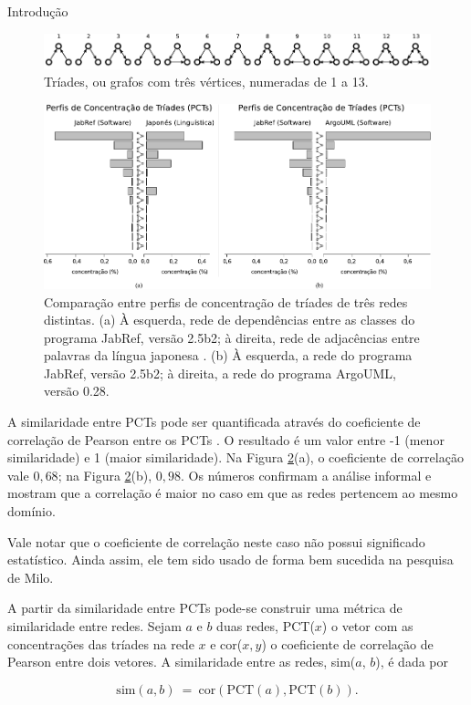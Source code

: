 \begin{section}{Introdução}
\begin{figure}[htbp]
	\centering
		\includegraphics[scale=1]{figuras/triads}
	\caption{Tríades, ou grafos com três vértices, numeradas de 1 a 13.}
	\label{fig:triades}
\end{figure}

\begin{figure}[htbp]
	\centering
		\includegraphics[width=1\textwidth]{figuras/tcp}
	\caption{Comparação entre perfis de concentração de tríades de três redes distintas. (a) À esquerda, rede de dependências entre as classes do programa JabRef, versão 2.5b2; à direita, rede de adjacências entre palavras da língua japonesa \cite{Milo2004}. (b) À esquerda, a rede do programa JabRef, versão 2.5b2; à direita, a rede do programa ArgoUML, versão 0.28.}
	\label{fig:tcp}
\end{figure}

A similaridade entre PCTs pode ser quantificada através do coeficiente de correlação de Pearson entre os PCTs \cite{Milo2004}. O resultado é um valor entre -1 (menor similaridade) e 1 (maior similaridade). Na Figura \ref{fig:tcp}(a), o coeficiente de correlação vale $0,68$; na Figura \ref{fig:tcp}(b), $0,98$. Os números confirmam a análise informal e mostram que a correlação é maior no caso em que as redes pertencem ao mesmo domínio.

Vale notar que o coeficiente de correlação neste caso não possui significado estatístico. Ainda assim, ele tem sido usado de forma bem sucedida na pesquisa de Milo.

A partir da similaridade entre PCTs pode-se construir uma métrica de similaridade entre redes. Sejam $a$ e $b$ duas redes, PCT($x$) o vetor com as concentrações das tríades na rede $x$ e cor($x, y$) o coeficiente de correlação de Pearson entre dois vetores. A similaridade entre as redes, sim($a$, $b$), é dada por

$$
\mathrm{sim}(a, b) ~=~ 
  \mathrm{cor}(\mathrm{PCT}(a), \mathrm{PCT}(b))\mathrm{.}
$$

\end{section}

